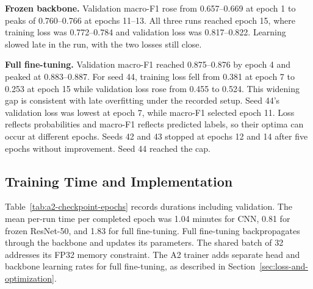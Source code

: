 \textbf{Frozen backbone.} Validation macro-F1 rose from 0.657--0.669 at epoch 1 to peaks of 0.760--0.766 at epochs 11--13. All three runs reached epoch 15, where training loss was 0.772--0.784 and validation loss was 0.817--0.822. Learning slowed late in the run, with the two losses still close.

\textbf{Full fine-tuning.} Validation macro-F1 reached 0.875--0.876 by epoch 4 and peaked at 0.883--0.887. For seed 44, training loss fell from 0.381 at epoch 7 to 0.253 at epoch 15 while validation loss rose from 0.455 to 0.524. This widening gap is consistent with late overfitting under the recorded setup. Seed 44's validation loss was lowest at epoch 7, while macro-F1 selected epoch 11. Loss reflects probabilities and macro-F1 reflects predicted labels, so their optima can occur at different epochs. Seeds 42 and 43 stopped at epochs 12 and 14 after five epochs without improvement. Seed 44 reached the cap.

\subsection{Training Time and Implementation}

Table~\ref{tab:a2-checkpoint-epochs} records durations including validation. The mean per-run time per completed epoch was 1.04 minutes for CNN, 0.81 for frozen ResNet-50, and 1.83 for full fine-tuning. Full fine-tuning backpropagates through the backbone and updates its parameters. The shared batch of 32 addresses its FP32 memory constraint. The A2 trainer adds separate head and backbone learning rates for full fine-tuning, as described in Section~\ref{sec:loss-and-optimization}.

\clearpage
